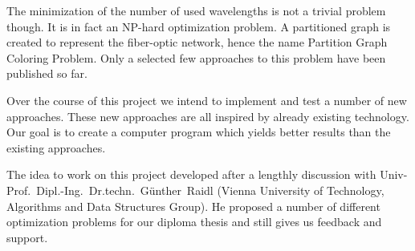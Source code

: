\documentclass[paper=a4,fontsize=12pt]{scrartcl}
\begin{document}

The minimization of the number of used wavelengths is not a trivial problem though. It is in fact an NP-hard optimization problem. A partitioned graph is created to represent the fiber-optic network, hence the name
Partition Graph Coloring Problem. Only a selected few approaches to this problem have been published so far.


Over the course of this project we intend to implement and test a number of new approaches. These new approaches are all inspired by already existing technology. Our goal is to create a computer program which 
yields better results than the existing approaches. 


The idea to work on this project developed after a lengthly discussion with Univ-Prof.~Dipl.-Ing.~Dr.techn.~Günther~Raidl (Vienna University of Technology, Algorithms and Data Structures Group). He proposed a number of different optimization problems for our diploma thesis and still gives us feedback and support.

\end{document}
